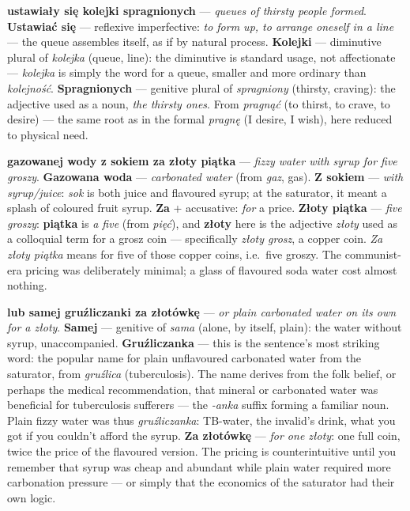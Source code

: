 \textbf{ustawiały się kolejki spragnionych} ---
\textit{queues of thirsty people formed}.
\textbf{Ustawiać się} --- reflexive imperfective:
\textit{to form up, to arrange oneself in a line} ---
the queue assembles itself, as if by natural process.
\textbf{Kolejki} --- diminutive plural of
\textit{kolejka} (queue, line): the diminutive is
standard usage, not affectionate --- \textit{kolejka}
is simply the word for a queue, smaller and more
ordinary than \textit{kolejność}. \textbf{Spragnionych}
--- genitive plural of \textit{spragniony} (thirsty,
craving): the adjective used as a noun, \textit{the
thirsty ones}. From \textit{pragnąć} (to thirst, to
crave, to desire) --- the same root as in the formal
\textit{pragnę} (I desire, I wish), here reduced to
physical need.

\textbf{gazowanej wody z sokiem za złoty piątka} ---
\textit{fizzy water with syrup for five groszy}.
\textbf{Gazowana woda} --- \textit{carbonated water}
(from \textit{gaz}, gas). \textbf{Z sokiem} ---
\textit{with syrup/juice}: \textit{sok} is both
juice and flavoured syrup; at the saturator, it
meant a splash of coloured fruit syrup. \textbf{Za}
+ accusative: \textit{for} a price. \textbf{Złoty
piątka} --- \textit{five groszy}: \textbf{piątka}
is \textit{a five} (from \textit{pięć}), and
\textbf{złoty} here is the adjective \textit{złoty}
used as a colloquial term for a grosz coin ---
specifically \textit{złoty grosz}, a copper coin.
\textit{Za złoty piątka} means for five of those
copper coins, i.e.\ five groszy. The communist-era
pricing was deliberately minimal; a glass of
flavoured soda water cost almost nothing.

\textbf{lub samej gruźliczanki za złotówkę} ---
\textit{or plain carbonated water on its own for
a złoty}. \textbf{Samej} --- genitive of \textit{sama}
(alone, by itself, plain): the water without syrup,
unaccompanied. \textbf{Gruźliczanka} --- this is
the sentence's most striking word: the popular
name for plain unflavoured carbonated water from
the saturator, from \textit{gruźlica} (tuberculosis).
The name derives from the folk belief, or perhaps
the medical recommendation, that mineral or
carbonated water was beneficial for tuberculosis
sufferers --- the \textit{-anka} suffix forming
a familiar noun. Plain fizzy water was thus
\textit{gruźliczanka}: TB-water, the invalid's
drink, what you got if you couldn't afford the
syrup. \textbf{Za złotówkę} --- \textit{for one
złoty}: one full coin, twice the price of the
flavoured version. The pricing is counterintuitive
until you remember that syrup was cheap and
abundant while plain water required more
carbonation pressure --- or simply that the
economics of the saturator had their own logic.

